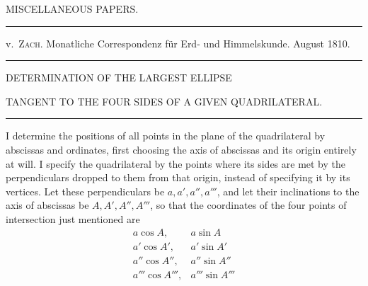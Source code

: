 \clearpage
{}
\begin{center}
{\Large MISCELLANEOUS PAPERS.}\par\bigskip
\rule{.85\textwidth}{.3pt}\par
v.\ \textsc{Zach}. Monatliche Correspondenz für Erd- und Himmelskunde. August 1810.\par
\rule{.85\textwidth}{.3pt}\par\bigskip
DETERMINATION OF THE LARGEST ELLIPSE\par\medskip
TANGENT TO THE FOUR SIDES OF A GIVEN QUADRILATERAL.\par\bigskip
\rule{.15\textwidth}{.3pt}
\end{center}
\hspace*{\parindent}I determine the positions of all points in the plane of the quadrilateral by abscissas and ordinates, first choosing the axis of abscissas and its origin entirely at will. I specify the quadrilateral by the points where its sides are met by the perpendiculars dropped to them from that origin, instead of specifying it by its vertices. Let these perpendiculars be \(a,a',a'',a'''\), and let their inclinations to the axis of abscissas be \(A,A',A'',A'''\), so that the coordinates of the four points of intersection just mentioned are
\[
\begin{array}{ll}
a\cos A,&a\sin A\\
a'\cos A',&a'\sin A'\\
a''\cos A'',&a''\sin A''\\
a'''\cos A''',&a'''\sin A'''
\end{array}
\]
